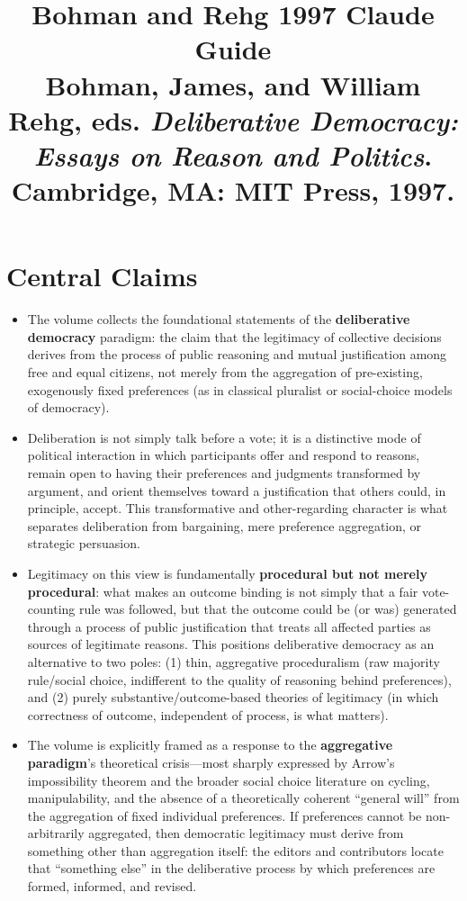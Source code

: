 \documentclass[12pt]{article}
\title{\textbf{Bohman and Rehg 1997 Claude Guide}\\
\large Bohman, James, and William Rehg, eds. \textit{Deliberative Democracy: Essays on Reason and Politics}.\\
Cambridge, MA: MIT Press, 1997.}
\author{}
\date{}
\begin{document}
\maketitle
\tableofcontents
\newpage

\section{Central Claims}

\begin{itemize}[leftmargin=*, itemsep=4pt]
    \item The volume collects the foundational statements of the \textbf{deliberative democracy} paradigm: the claim that the legitimacy of collective decisions derives from the process of public reasoning and mutual justification among free and equal citizens, not merely from the aggregation of pre-existing, exogenously fixed preferences (as in classical pluralist or social-choice models of democracy).
    \item Deliberation is not simply talk before a vote; it is a distinctive mode of political interaction in which participants offer and respond to reasons, remain open to having their preferences and judgments transformed by argument, and orient themselves toward a justification that others could, in principle, accept. This transformative and other-regarding character is what separates deliberation from bargaining, mere preference aggregation, or strategic persuasion.
    \item Legitimacy on this view is fundamentally \textbf{procedural but not merely procedural}: what makes an outcome binding is not simply that a fair vote-counting rule was followed, but that the outcome could be (or was) generated through a process of public justification that treats all affected parties as sources of legitimate reasons. This positions deliberative democracy as an alternative to two poles: (1) thin, aggregative proceduralism (raw majority rule/social choice, indifferent to the quality of reasoning behind preferences), and (2) purely substantive/outcome-based theories of legitimacy (in which correctness of outcome, independent of process, is what matters).
    \item The volume is explicitly framed as a response to the \textbf{aggregative paradigm}'s theoretical crisis---most sharply expressed by Arrow's impossibility theorem and the broader social choice literature on cycling, manipulability, and the absence of a theoretically coherent ``general will'' from the aggregation of fixed individual preferences. If preferences cannot be non-arbitrarily aggregated, then democratic legitimacy must derive from something other than aggregation itself: the editors and contributors locate that ``something else'' in the deliberative process by which preferences are formed, informed, and revised.

\end{itemize}
\end{document}
